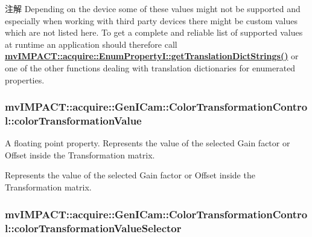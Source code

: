 \begin{DoxyNote}{注解}
Depending on the device some of these values might not be supported and especially when working with third party devices there might be custom values which are not listed here. To get a complete and reliable list of supported values at runtime an application should therefore call {\bfseries \hyperlink{classmv_i_m_p_a_c_t_1_1acquire_1_1_enum_property_i_a0ba6ccbf5ee69784d5d0b537924d26b6}{mv\+I\+M\+P\+A\+C\+T\+::acquire\+::\+Enum\+Property\+I\+::get\+Translation\+Dict\+Strings()}} or one of the other functions dealing with translation dictionaries for enumerated properties. 
\end{DoxyNote}
\hypertarget{classmv_i_m_p_a_c_t_1_1acquire_1_1_gen_i_cam_1_1_color_transformation_control_a20316b065654454864716f50f825c8d3}{
\subsubsection[{color\+Transformation\+Value}]{ mv\+I\+M\+P\+A\+C\+T\+::acquire\+::\+Gen\+I\+Cam\+::\+Color\+Transformation\+Control\+::color\+Transformation\+Value}}\label{classmv_i_m_p_a_c_t_1_1acquire_1_1_gen_i_cam_1_1_color_transformation_control_a20316b065654454864716f50f825c8d3}


A floating point property. Represents the value of the selected Gain factor or Offset inside the Transformation matrix. 

Represents the value of the selected Gain factor or Offset inside the Transformation matrix. \hypertarget{classmv_i_m_p_a_c_t_1_1acquire_1_1_gen_i_cam_1_1_color_transformation_control_acf4e51631a982d84b3e6df57be983457}{
\subsubsection[{color\+Transformation\+Value\+Selector}]{ mv\+I\+M\+P\+A\+C\+T\+::acquire\+::\+Gen\+I\+Cam\+::\+Color\+Transformation\+Control\+::color\+Transformation\+Value\+Selector}}\label{classmv_i_m_p_a_c_t_1_1acquire_1_1_gen_i_cam_1_1_color_transformation_control_acf4e51631a982d84b3e6df57be983457}


